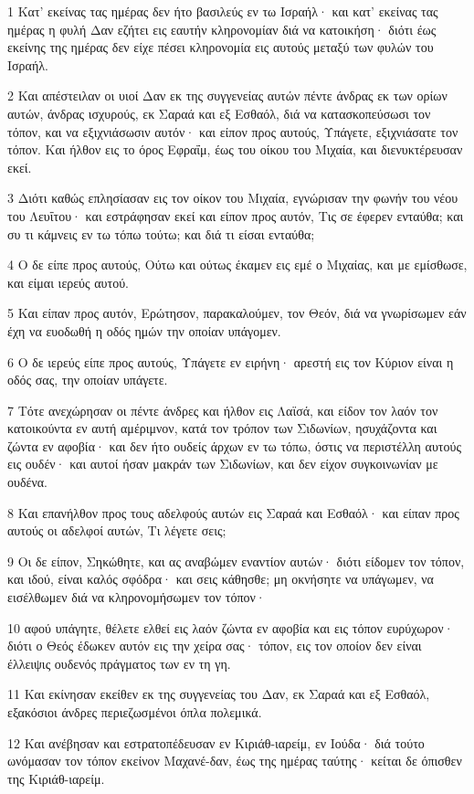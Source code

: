 \par 1 Κατ' εκείνας τας ημέρας δεν ήτο βασιλεύς εν τω Ισραήλ· και κατ' εκείνας τας ημέρας η φυλή Δαν εζήτει εις εαυτήν κληρονομίαν διά να κατοικήση· διότι έως εκείνης της ημέρας δεν είχε πέσει κληρονομία εις αυτούς μεταξύ των φυλών του Ισραήλ.
\par 2 Και απέστειλαν οι υιοί Δαν εκ της συγγενείας αυτών πέντε άνδρας εκ των ορίων αυτών, άνδρας ισχυρούς, εκ Σαραά και εξ Εσθαόλ, διά να κατασκοπεύσωσι τον τόπον, και να εξιχνιάσωσιν αυτόν· και είπον προς αυτούς, Υπάγετε, εξιχνιάσατε τον τόπον. Και ήλθον εις το όρος Εφραΐμ, έως του οίκου του Μιχαία, και διενυκτέρευσαν εκεί.
\par 3 Διότι καθώς επλησίασαν εις τον οίκον του Μιχαία, εγνώρισαν την φωνήν του νέου του Λευΐτου· και εστράφησαν εκεί και είπον προς αυτόν, Τις σε έφερεν ενταύθα; και συ τι κάμνεις εν τω τόπω τούτω; και διά τι είσαι ενταύθα;
\par 4 Ο δε είπε προς αυτούς, Ούτω και ούτως έκαμεν εις εμέ ο Μιχαίας, και με εμίσθωσε, και είμαι ιερεύς αυτού.
\par 5 Και είπαν προς αυτόν, Ερώτησον, παρακαλούμεν, τον Θεόν, διά να γνωρίσωμεν εάν έχη να ευοδωθή η οδός ημών την οποίαν υπάγομεν.
\par 6 Ο δε ιερεύς είπε προς αυτούς, Υπάγετε εν ειρήνη· αρεστή εις τον Κύριον είναι η οδός σας, την οποίαν υπάγετε.
\par 7 Τότε ανεχώρησαν οι πέντε άνδρες και ήλθον εις Λαϊσά, και είδον τον λαόν τον κατοικούντα εν αυτή αμέριμνον, κατά τον τρόπον των Σιδωνίων, ησυχάζοντα και ζώντα εν αφοβία· και δεν ήτο ουδείς άρχων εν τω τόπω, όστις να περιστέλλη αυτούς εις ουδέν· και αυτοί ήσαν μακράν των Σιδωνίων, και δεν είχον συγκοινωνίαν με ουδένα.
\par 8 Και επανήλθον προς τους αδελφούς αυτών εις Σαραά και Εσθαόλ· και είπαν προς αυτούς οι αδελφοί αυτών, Τι λέγετε σεις;
\par 9 Οι δε είπον, Σηκώθητε, και ας αναβώμεν εναντίον αυτών· διότι είδομεν τον τόπον, και ιδού, είναι καλός σφόδρα· και σεις κάθησθε; μη οκνήσητε να υπάγωμεν, να εισέλθωμεν διά να κληρονομήσωμεν τον τόπον·
\par 10 αφού υπάγητε, θέλετε ελθεί εις λαόν ζώντα εν αφοβία και εις τόπον ευρύχωρον· διότι ο Θεός έδωκεν αυτόν εις την χείρα σας· τόπον, εις τον οποίον δεν είναι έλλειψις ουδενός πράγματος των εν τη γη.
\par 11 Και εκίνησαν εκείθεν εκ της συγγενείας του Δαν, εκ Σαραά και εξ Εσθαόλ, εξακόσιοι άνδρες περιεζωσμένοι όπλα πολεμικά.
\par 12 Και ανέβησαν και εστρατοπέδευσαν εν Κιριάθ-ιαρείμ, εν Ιούδα· διά τούτο ωνόμασαν τον τόπον εκείνον Μαχανέ-δαν, έως της ημέρας ταύτης· κείται δε όπισθεν της Κιριάθ-ιαρείμ.
